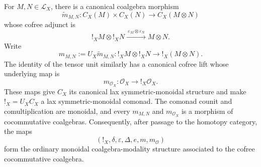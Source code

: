 \begin{proposition}
\label{prop:cofree-monoidal-coalgebra-modality}
For \(M,N\in\mathcal L_X\), there is a canonical coalgebra morphism
\[
    \widetilde m_{M,N}:
    C_X(M)\times C_X(N)
    \longrightarrow
    C_X(M\otimes N)
\]
whose cofree adjunct is
\[
    !_XM\otimes !_XN
    \xrightarrow{\ \varepsilon_M\otimes\varepsilon_N\ }
    M\otimes N.
\]
Write
\[
    m_{M,N}:=U_X\widetilde m_{M,N}:
    !_XM\otimes !_XN\longrightarrow !_X(M\otimes N).
\]
The identity of the tensor unit similarly has a canonical cofree lift whose
underlying map is
\[
    m_{\mathcal O_X}:
    \mathcal O_X\longrightarrow !_X\mathcal O_X.
\]
These maps give \(C_X\) its canonical lax symmetric-monoidal structure and
make \(!_X=U_XC_X\) a lax symmetric-monoidal comonad. The comonad counit and
comultiplication are monoidal, and every \(m_{M,N}\) and
\(m_{\mathcal O_X}\) is a morphism of cocommutative coalgebras.
Consequently, after passage to the homotopy category, the maps
\[
    (!_X,\delta,\varepsilon,\Delta,e,m,m_{\mathcal O})
\]
form the ordinary monoidal coalgebra-modality structure associated to the
cofree cocommutative coalgebra.
\end{proposition}

